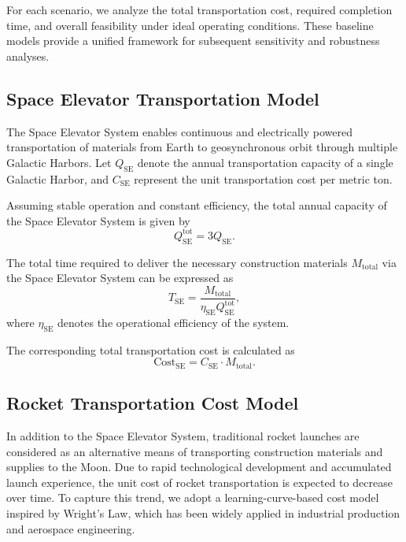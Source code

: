 \documentclass[demo]{mcmthesis}
\begin{document}
For each scenario, we analyze the total transportation cost, required completion time, and overall feasibility under ideal operating conditions. 
These baseline models provide a unified framework for subsequent sensitivity and robustness analyses.

\subsection{Space Elevator Transportation Model}
The Space Elevator System enables continuous and electrically powered transportation of materials from Earth to geosynchronous orbit through multiple Galactic Harbors. 
Let $Q_{\text{SE}}$ denote the annual transportation capacity of a single Galactic Harbor, and $C_{\text{SE}}$ represent the unit transportation cost per metric ton.

Assuming stable operation and constant efficiency, the total annual capacity of the Space Elevator System is given by
\begin{equation}
Q_{\text{SE}}^{\text{tot}} = 3 Q_{\text{SE}}.
\end{equation}

The total time required to deliver the necessary construction materials $M_{\text{total}}$ via the Space Elevator System can be expressed as
\begin{equation}
T_{\text{SE}} = \frac{M_{\text{total}}}{\eta_{\text{SE}} Q_{\text{SE}}^{\text{tot}}},
\end{equation}
where $\eta_{\text{SE}}$ denotes the operational efficiency of the system.

The corresponding total transportation cost is calculated as
\begin{equation}
\text{Cost}_{\text{SE}} = C_{\text{SE}} \cdot M_{\text{total}}.
\end{equation}

\subsection{Rocket Transportation Cost Model}

In addition to the Space Elevator System, traditional rocket launches are considered as an alternative means of transporting construction materials and supplies to the Moon. 
Due to rapid technological development and accumulated launch experience, the unit cost of rocket transportation is expected to decrease over time. 
To capture this trend, we adopt a learning-curve-based cost model inspired by Wright’s Law, which has been widely applied in industrial production and aerospace engineering.
\end{document}
